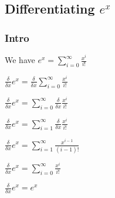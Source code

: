 
\subsection{Differentiating \(e^x\)}

\subsubsection{Intro}

We have \(e^x=\sum^{\infty }_{i=0} \frac{x^i}{i!}\)

\(\frac{\delta }{\delta x}e^x=\frac{\delta }{\delta x}\sum^{\infty }_{i=0} \frac{x^i}{i!}\)

\(\frac{\delta }{\delta x}e^x=\sum^{\infty }_{i=0} \frac{\delta }{\delta x}\frac{x^i}{i!}\)

\(\frac{\delta }{\delta x}e^x=\sum^{\infty }_{i=1} \frac{\delta }{\delta x}\frac{x^i}{i!}\)

\(\frac{\delta }{\delta x}e^x=\sum^{\infty }_{i=1} \frac{x^{i-1}}{(i-1)!}\)

\(\frac{\delta }{\delta x}e^x=\sum^{\infty }_{i=0} \frac{x^{i}}{i!}\)

\(\frac{\delta }{\delta x}e^x=e^x\)


